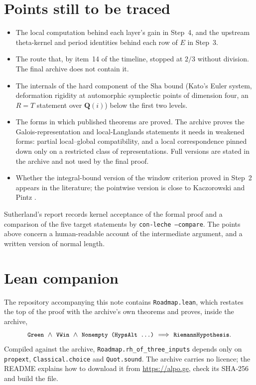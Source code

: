 \documentclass[11pt]{article}
\newcommand{\Lean}[1]{\texttt{\small #1}}
\newcommand{\Q}{\mathbf{Q}}
\newcommand{\Sha}{\mathrm{Sha}}
\begin{document}
\section{Points still to be traced}\label{sec:open}
\begin{itemize}
\item The local computation behind each layer's gain in Step~4, and the upstream theta-kernel and period identities behind each row of $E$ in Step~3.
\item The route that, by item~14 of the timeline, stopped at $2/3$ without division. The final archive does not contain it.
\item The internals of the hard component of the $\Sha$ bound (Kato's Euler system, deformation rigidity at automorphic symplectic points of dimension four, an $R=T$ statement over $\Q(i)$) below the first two levels.
\item The forms in which published theorems are proved. The archive proves the Galois-representation and local-Langlands statements it needs in weakened forms: partial local--global compatibility, and a local correspondence pinned down only on a restricted class of representations. Full versions are stated in the archive and not used by the final proof.
\item Whether the integral-bound version of the window criterion proved in Step~2 appears in the literature; the pointwise version is close to Kaczorowski and Pintz \cite{kp}.
\end{itemize}
Sutherland's report records kernel acceptance of the formal proof and a comparison of the five target statements by \Lean{con-leche --compare}. The points above concern a human-readable account of the intermediate argument, and a written version of normal length.

\section{Lean companion}
The repository accompanying this note contains \Lean{Roadmap.lean}, which restates the top of the proof with the archive's own theorems and proves, inside the archive,
\[
\Lean{Green}\ \wedge\ \Lean{VWin}\ \wedge\ \Lean{Nonempty (HypsAlt \dots)}\ \Longrightarrow\ \Lean{RiemannHypothesis}.
\]
Compiled against the archive, \Lean{Roadmap.rh\_of\_three\_inputs} depends only on \Lean{propext}, \Lean{Classical.choice} and \Lean{Quot.sound}. The archive carries no licence; the README explains how to download it from \url{https://alpo.ge}, check its SHA-256 and build the file.
\end{document}
